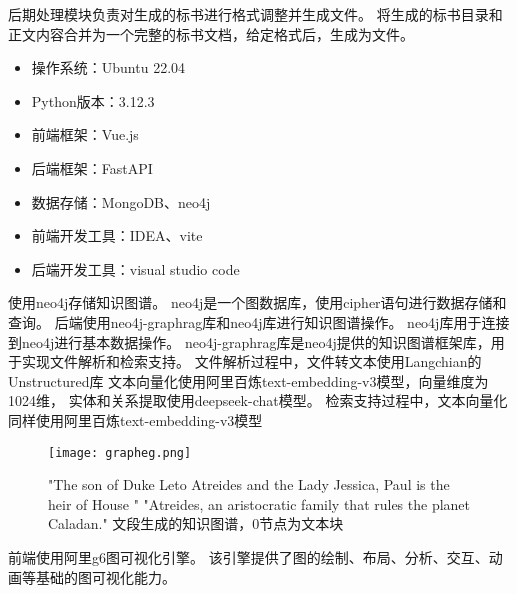 \documentclass{xmu}
\begin{document}
后期处理模块负责对生成的标书进行格式调整并生成文件。
将生成的标书目录和正文内容合并为一个完整的标书文档，给定格式后，生成为文件。
    \begin{itemize}
        \item 操作系统：Ubuntu 22.04
        \item Python版本：3.12.3
    \end{itemize}
    \begin{itemize}
        \item 前端框架：Vue.js
        \item 后端框架：FastAPI
        \item 数据存储：MongoDB、neo4j
    \end{itemize}
    \begin{itemize}
        \item 前端开发工具：IDEA、vite
        \item 后端开发工具：visual studio code
    \end{itemize}
    使用neo4j存储知识图谱。
    neo4j是一个图数据库，使用cipher语句进行数据存储和查询。
    后端使用neo4j-graphrag库和neo4j库进行知识图谱操作。
    neo4j库用于连接到neo4j进行基本数据操作。
    neo4j-graphrag库是neo4j提供的知识图谱框架库，用于实现文件解析和检索支持。
    文件解析过程中，文件转文本使用Langchian的Unstructured库
    文本向量化使用阿里百炼text-embedding-v3模型，向量维度为1024维，
    实体和关系提取使用deepseek-chat模型。
    检索支持过程中，文本向量化同样使用阿里百炼text-embedding-v3模型
    
    \begin{figure}[!htb]
        \centering
        \texttt{[image: grapheg.png]}\\
        \caption{
        "The son of Duke Leto Atreides and the Lady Jessica, Paul is the heir of House "
        "Atreides, an aristocratic family that rules the planet Caladan."
        文段生成的知识图谱，0节点为文本块
        }\label{example}
    \end{figure}

    前端使用阿里g6图可视化引擎。
    该引擎提供了图的绘制、布局、分析、交互、动画等基础的图可视化能力。
\end{document}
